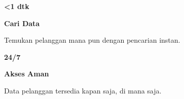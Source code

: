 \documentclass[a4paper]{article}
\begin{document}
\begin{minipage}[t]{0.485\textwidth}
    \noindent\colorbox{BlueBg}{%
        \begin{minipage}[t][2.7cm][c]{\dimexpr\linewidth-2\fboxsep\relax}
            \centering
            {\fontsize{20}{24}\selectfont\bfseries\color{BluePrimary} <1 dtk}\par\vspace{2pt}
            {\fontsize{9.5}{12}\selectfont\bfseries\color{BlueDark} Cari Data}\par\vspace{2pt}
            {\fontsize{8.5}{11}\selectfont\color{TextDark}Temukan pelanggan mana pun dengan pencarian instan.}
        \end{minipage}}\par
    \vspace{6pt}
    \noindent\colorbox{BlueBg}{%
        \begin{minipage}[t][2.7cm][c]{\dimexpr\linewidth-2\fboxsep\relax}
            \centering
            {\fontsize{20}{24}\selectfont\bfseries\color{BluePrimary} 24/7}\par\vspace{2pt}
            {\fontsize{9.5}{12}\selectfont\bfseries\color{BlueDark} Akses Aman}\par\vspace{2pt}
            {\fontsize{8.5}{11}\selectfont\color{TextDark}Data pelanggan tersedia kapan saja, di mana saja.}
        \end{minipage}}%
\end{minipage}

\vspace{8pt}
\end{document}
